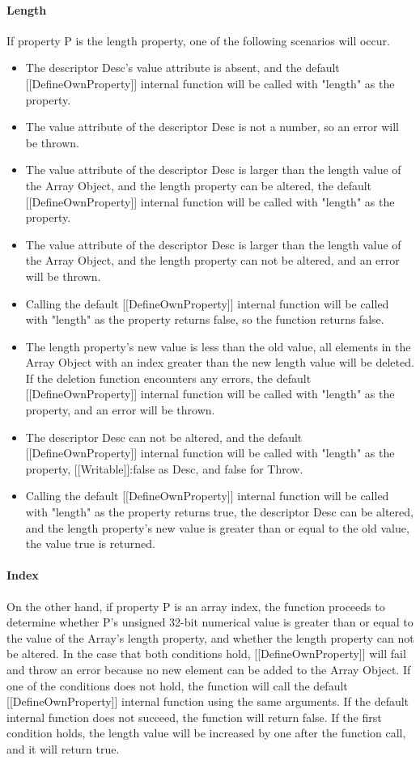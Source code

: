 \documentclass[a4paper,11pt,twoside]{report}
\begin{document}
\paragraph{Length}
If property P is the length property, one of the following scenarios will occur.
\begin{itemize}
\item The descriptor Desc's value attribute is absent, and the default [[DefineOwnProperty]] internal function will be called with "length" as the property.
\item The value attribute of the descriptor Desc is not a number, so an error will be thrown.
\item The value attribute of the descriptor Desc is larger than the length value of the Array Object, and the length property can be altered, the default [[DefineOwnProperty]] internal function will be called with "length" as the property.
\item The value attribute of the descriptor Desc is larger than the length value of the Array Object, and the length property can not be altered, and an error will be thrown.
\item Calling the default [[DefineOwnProperty]] internal function will be called with "length" as the property returns false, so the function returns false.
\item The length property's new value is less than the old value, all elements in the Array Object with an index greater than the new length value will be deleted. If the deletion function encounters any errors, the default [[DefineOwnProperty]] internal function will be called with "length" as the property, and an error will be thrown.
\item The descriptor Desc can not be altered, and the default [[DefineOwnProperty]] internal function will be called with "length" as the property, [[Writable]]:false as Desc, and false for Throw.
\item Calling the default [[DefineOwnProperty]] internal function will be called with "length" as the property returns true, the descriptor Desc can be altered, and the length property's new value is greater than or equal to the old value, the value true is returned.
\end{itemize}

\paragraph{Index}
On the other hand, if property P is an array index, the function proceeds to determine whether P's unsigned 32-bit numerical value is greater than or equal to the value of the Array's length property, and whether the length property can not be altered. In the case that both conditions hold, [[DefineOwnProperty]] will fail and throw an error because no new element can be added to the Array Object. If one of the conditions does not hold, the function will call the default [[DefineOwnProperty]] internal function using the same arguments. If the default internal function does not succeed, the function will return false. If the first condition holds, the length value will be increased by one after the function call, and it will return true.
\end{document}
